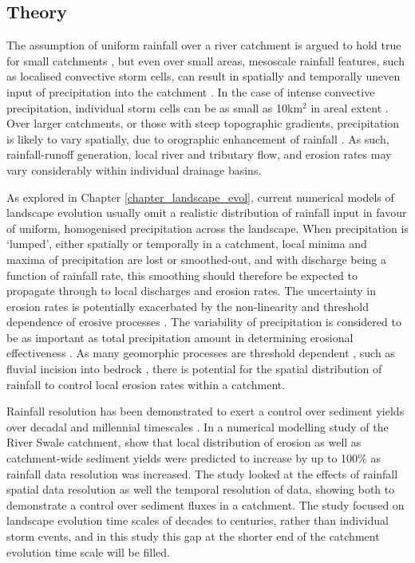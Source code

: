 \subsection{Theory}
The assumption of uniform rainfall over a river catchment is argued to hold true for small catchments \citep{Solyom2004,Tucker2010}, but even over small areas, mesoscale rainfall features, such as localised convective storm cells, can result in spatially and temporally uneven input of precipitation into the catchment \citep{Peleg2014}. In the case of intense convective precipitation, individual storm cells can be as small as 10km$^2$ in areal extent  \citep{weisman1986characteristics,vonhardenberg2003shape}. Over larger catchments, or those with steep topographic gradients, precipitation is likely to vary spatially, due to orographic enhancement of rainfall \citep{Roe2003,han2015measuring}. As such, rainfall-runoff generation, local river and tributary flow, and erosion rates may vary considerably within individual drainage basins. 

As explored in Chapter \ref{chapter_landscape_evol}, current numerical models of landscape evolution usually omit a realistic distribution of rainfall input in favour of uniform, homogenised precipitation across the landscape. When precipitation is `lumped', either spatially or temporally in a catchment, local minima and maxima of precipitation are lost or smoothed-out, and with discharge being a function of rainfall rate, this smoothing should therefore be expected to propagate through to local discharges and erosion rates. The uncertainty in erosion rates is potentially exacerbated by the non-linearity and threshold dependence of erosive processes \citep{coulthard1998non,phillips2003sources}. The variability of precipitation is considered to be as important as total precipitation amount in determining erosional effectiveness \citep{Tucker2000,Tucker2010}. As many geomorphic processes are threshold dependent \citep{schumm1979geomorphic}, such as fluvial incision into bedrock \citep{sklar2001sediment,snyder2003importance}, there is potential for the spatial distribution of rainfall to control local erosion rates within a catchment. 

Rainfall resolution has been demonstrated to exert a control over sediment yields over decadal and millennial timescales \citep{coulthard2016sensitivity}. In a numerical modelling study of the River Swale catchment, \citet{coulthard2016sensitivity} show that local distribution of erosion as well as catchment-wide sediment yields were predicted to increase by up to 100\% as rainfall data resolution was increased. The study looked at the effects of rainfall spatial data resolution as well the temporal resolution of data, showing both to demonstrate a control over sediment fluxes in a catchment. The study focused on landscape evolution time scales of decades to centuries, rather than individual storm events, and in this study this gap at the shorter end of the catchment evolution time scale will be filled. 

